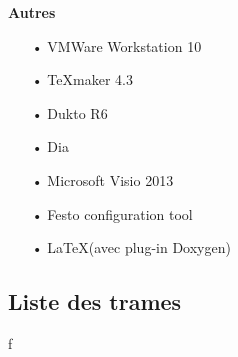 \documentclass[10pt,a4paper,final]{article}
\begin{document}
\begin{spacing}{1.5}
\begin{flushleft}
\begin{multicols}{3}
\textbf{Autres}
\begin{itemize}
\item[•]VMWare Workstation 10
\item[•]TeXmaker 4.3
\item[•]Dukto R6
\item[•]Dia
\item[•]Microsoft Visio 2013
\item[•]Festo configuration tool
\item[•]\LaTeX (avec plug-in Doxygen)
\end{itemize}

\end{multicols}
\end{flushleft}
\begin{flushleft}
\HRule
\end{flushleft}

\pagebreak
\subsection{Liste des trames}
\end{spacing}
f
\end{document}
